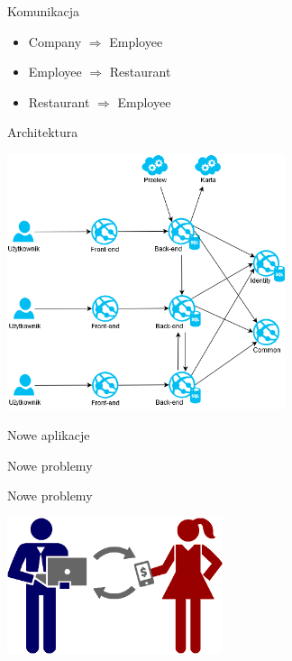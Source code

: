 \documentclass{beamer}
\begin{document}
\begin{frame}{Komunikacja}
	\begin{huge}
		\begin{itemize}[<+->]
			\item Company $\Rightarrow$ Employee
			\item Employee $\Rightarrow$ Restaurant
			\item Restaurant $\Rightarrow$ Employee
		\end{itemize}
	\end{huge}
\end{frame}

\begin{frame}{Architektura}
	\begin{center}
		\includegraphics[height=7.5cm]{architektura3.png}
	\end{center}
\end{frame}

\begin{frame}{Nowe aplikacje}
	\begin{center}
		\Huge{Nowe problemy}
	\end{center}
\end{frame}

\begin{frame}{Nowe problemy}
	\begin{center}
		\includegraphics[height=4cm]{pay1.png}
	\end{center}
\end{frame}
\end{document}
